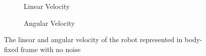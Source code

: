 \documentclass[letterpaper,12pt]{article}
\begin{document}
\begin{figure}[H]
    \centering
    \begin{subfigure}[b]{8.cm}
        \centering
        \captionsetup{justification=centering}
        \caption{Linear Velocity}
        \label{fig:kermit}
    \end{subfigure}
    \begin{subfigure}[b]{8.cm}
        \centering
        \captionsetup{justification=centering}
        \caption{Angular Velocity}
        \label{fig:rana}
    \end{subfigure}
\caption{The linear and angular velocity of the robot represented in body-fixed frame with no noise}
\label{fig:map2_3}
\end{figure}
\end{document}
